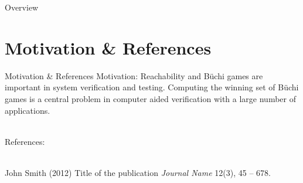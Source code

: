 
\begin{frame}[plain]
    \titlepage
\end{frame}

\begin{frame}{Overview}
    \tableofcontents
\end{frame}

\section{Motivation \& References}
\begin{frame}{Motivation \& References}
    Motivation: Reachability and Büchi games are important in system verification and testing. Computing the winning set of Büchi games is a central problem in computer aided verification with a large number of applications.\\~
    
    References: \\~
    \footnotesize{
        \begin{thebibliography}{99}
             John Smith (2012)
            \newblock Title of the publication
            \newblock \emph{Journal Name} 12(3), 45 -- 678.
        \end{thebibliography}
    }
\end{frame}
